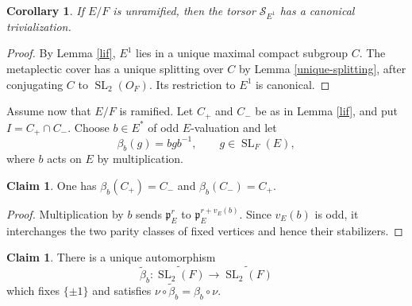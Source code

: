 \documentclass[11pt,a4paper,twoside]{amsart}
\newtheorem{corollary}[theorem]{Corollary}
\theoremstyle{definition}
\newtheorem{claim}[theorem]{Claim}
\theoremstyle{remark}
\newcommand{\mcS}{\mathcal S}
\newcommand{\SL}{\operatorname{SL}}
\begin{document}
\begin{corollary}\label{lift}
If $E/F$ is unramified, then the torsor $\mcS_{E^1}$ has a canonical trivialization.
\end{corollary}
\begin{proof}
By Lemma \ref{lif}, $E^1$ lies in a unique maximal compact subgroup $C$. The metaplectic cover has a unique splitting over $C$ by Lemma \ref{unique-splitting}, after conjugating $C$ to $\SL_2(O_F)$. Its restriction to $E^1$ is canonical.
\end{proof}
Assume now that $E/F$ is ramified. Let $C_+$ and $C_-$ be as in Lemma \ref{lif}, and put $I=C_+\cap C_-$. Choose $b\in E^*$ of odd $E$-valuation and let
$$
\beta_b(g)=bgb^{-1},\qquad g\in\SL_F(E),
$$
where $b$ acts on $E$ by multiplication.
\begin{claim}\label{beta-swap}
One has $\beta_b(C_+)=C_-$ and $\beta_b(C_-)=C_+$.
\end{claim}
\begin{proof}
Multiplication by $b$ sends $\mathfrak p_E^r$ to $\mathfrak p_E^{r+v_E(b)}$. Since $v_E(b)$ is odd, it interchanges the two parity classes of fixed vertices and hence their stabilizers.
\end{proof}
\begin{claim}\label{beta-lift}
There is a unique automorphism
$$
\widetilde\beta_b:\widetilde{\SL_2(F)}\longrightarrow\widetilde{\SL_2(F)}
$$
which fixes $\{\pm1\}$ and satisfies $\nu\circ\widetilde\beta_b=\beta_b\circ\nu$.
\end{claim}
\end{document}

